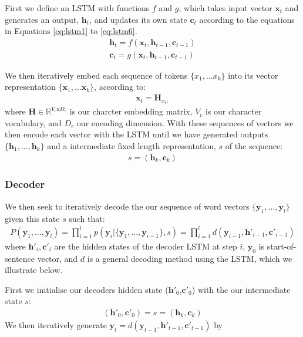 First we define an LSTM with functions $f$ and $g$, which takes input vector $\textbf{x}_t$ and generates an output, $\textbf{h}_t$, and updates its own state $\textbf{c}_t$ according to the equations in Equations \ref{eq:lstm1} to \ref{eq:lstm6}.
\begin{align}
    \textbf{h}_t = f(\textbf{x}_t, \textbf{h}_{t-1}, \textbf{c}_{t-1}) \label{eq:s2sh}\\
    \textbf{c}_t = g(\textbf{x}_t, \textbf{h}_{t-1}, \textbf{c}_{t-1}) \label{eq:s2sc}
\end{align}

We then iteratively embed each sequence of tokens $\{x_1,...x_k\}$ into its vector representation $\{\textbf{x}_1,...\textbf{x}_k\}$, according to:
\begin{align}
    \textbf{x}_t = \mathbf{H}_{x_t:}
\end{align}
where $\textbf{H} \in \mathbb{R}^{V_c\text{x}D_c}$ is our charcter embedding matrix, $V_c$ is our character vocabulary, and $D_c$ our encoding dimension.
With these sequences of vectors we then encode each vector with the LSTM until we have generated outputs $\{\textbf{h}_1,...,\textbf{h}_k\}$ and a intermediate fixed length representation, $s$ of the sequence: 
\begin{align}
     s = (\textbf{h}_k, \textbf{c}_k) \label{eq:s2s_state}
\end{align}

\subsubsection{Decoder}

We then seek to iteratively decode the our sequence of word vectors $\{\textbf{y}_1,..., \textbf{y}_l\}$ given this state $s$ such that:
\begin{align}
    P(\textbf{y}_1,...,\textbf{y}_l) = \prod_{i=1}^l p(\textbf{y}_i| \{\textbf{y}_1,...,\textbf{y}_{i-1}\}, s)  = \prod_{i=1}^ld(\mathbf{y}_{i-1}, \mathbf{h}'_{i-1},\mathbf{c}'_{i-1} )
\end{align}
where $\mathbf{h}'_{i},\mathbf{c}'_{i} $ are the hidden states of the decoder LSTM at step $i$, $\mathbf{y}_0$ is start-of-sentence vector, and $d$ is a general decoding method using the LSTM, which we illustrate below.

First we initialise our decoders hidden state ($\textbf{h}'_0$,$\textbf{c}'_0$) with the our intermediate state $s$:
\begin{align}
    (\textbf{h}'_0, \textbf{c}'_0) = s = (\textbf{h}_k, \textbf{c}_k) \label{eq:s2s_assign}
\end{align}
We then iteratively generate $\textbf{y}_t = d(\mathbf{y}_{t-1}, \mathbf{h}'_{t-1},\mathbf{c}'_{t-1} ) $ by 

